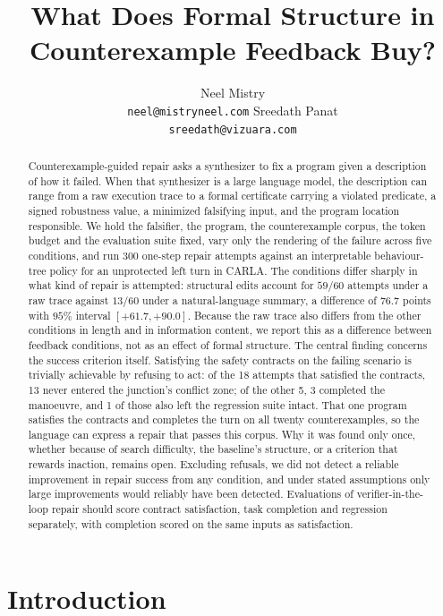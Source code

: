 \documentclass{article}
\title{What Does Formal Structure in Counterexample Feedback Buy?}
\author{%
  Neel Mistry\\
  \texttt{neel@mistryneel.com}
  \And
  Sreedath Panat\\
  \texttt{sreedath@vizuara.com}
}
\begin{document}
\maketitle

\begin{abstract}
Counterexample-guided repair asks a synthesizer to fix a program given a
description of how it failed. When that synthesizer is a large language model,
the description can range from a raw execution trace to a formal certificate
carrying a violated predicate, a signed robustness value, a minimized falsifying
input, and the program location responsible. We hold the falsifier, the program,
the counterexample corpus, the token budget and the evaluation suite fixed, vary
only the rendering of the failure across five conditions, and run 300 one-step
repair attempts against an interpretable behaviour-tree policy for an unprotected
left turn in CARLA. The conditions differ sharply in what kind of repair is
attempted: structural edits account for $59/60$ attempts under a raw trace
against $13/60$ under a natural-language summary, a difference of $76.7$ points
with $95\%$ interval $[+61.7,+90.0]$. Because the raw trace also differs from
the other conditions in length and in information content, we report this as a
difference between feedback conditions, not as an effect of formal structure.
The central finding concerns the success criterion itself. Satisfying the safety
contracts on the failing scenario is trivially achievable by refusing to act: of
the 18 attempts that satisfied the contracts, 13 never entered the junction's
conflict zone; of
the other 5, 3 completed the manoeuvre, and 1 of those also left the regression
suite intact. That one program satisfies the contracts and completes the turn on
all twenty counterexamples, so the language can express a repair that passes
this corpus. Why it was found only once, whether because of search difficulty,
the baseline's structure, or a criterion that rewards inaction, remains open.
Excluding refusals, we did not detect a reliable improvement in repair success
from any condition, and under stated assumptions only large improvements would
reliably have been detected. Evaluations of verifier-in-the-loop repair should score
contract satisfaction, task completion and regression separately, with
completion scored on the same inputs as satisfaction.
\end{abstract}

\section{Introduction}
\label{sec:intro}
\end{document}
